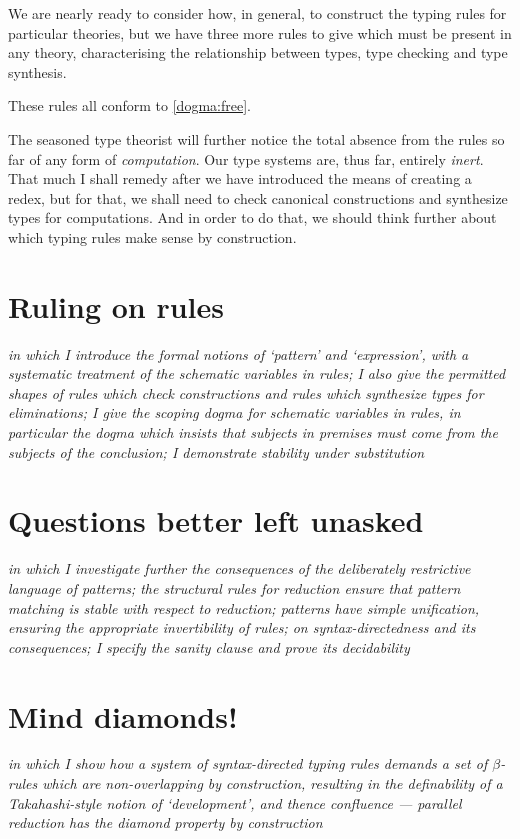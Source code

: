\documentclass{jfp1}
\begin{document}
We are nearly ready to consider how, in general, to construct the
typing rules for particular theories, but we have three more rules to
give which must be present in any theory, characterising the
relationship between types, type checking and type synthesis.

These rules all conform to \ref{dogma:free}.

The seasoned type theorist will further notice the total absence from the rules
so far of any form of \emph{computation}. Our type systems are, thus far,
entirely \emph{inert}. That much I shall remedy after we have introduced the
means of creating a redex, but for that, we shall need to check canonical constructions
and synthesize types for computations. And in order to do that, we should think further
about which typing rules make sense by construction.


\section{Ruling on rules}

\emph{in which I introduce the formal notions of `pattern' and `expression', with a
  systematic treatment of the schematic variables in rules; I also give the permitted
  shapes of rules which check constructions and rules which synthesize types for eliminations;
  I give the scoping dogma for schematic variables in rules, in particular the dogma which insists that subjects in premises must come from the subjects of the conclusion; I demonstrate stability under substitution}



\section{Questions better left unasked}

\emph{in which I investigate further the consequences of the deliberately restrictive language of patterns; the structural rules for reduction ensure that pattern matching is stable with respect to reduction; patterns have simple unification, ensuring the appropriate invertibility of rules; on syntax-directedness and its consequences; I specify the sanity clause and prove its decidability}

\section{Mind diamonds!}

\emph{in which I show how a system of syntax-directed typing rules demands a set of $\beta$-rules
  which are non-overlapping by construction, resulting in the definability of a Takahashi-style notion of `development', and thence confluence --- parallel reduction has the diamond property by construction}
\end{document}
